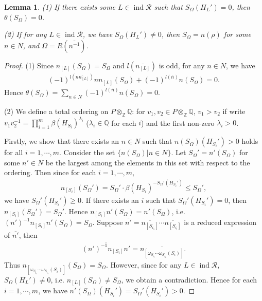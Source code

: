 \documentclass[12pt]{amsart}
\newtheorem{lemma}[theorem]{Lemma}
\begin{document}
\begin{lemma}\label{SOmega}
    (1) If there exists some $L\in \operatorname{ind}\mathcal{R}$ such that $S_{\Omega}(H_L') = 0$, then $\theta(S_{\Omega}) = 0$.

    (2) If for any $L\in \operatorname{ind}\mathcal{R}$, we have $S_{\Omega}(H_{L}')\neq 0$, then $S_{\Omega} = n(\rho)$ for some $n\in N$, and $\Omega = R(\overline{n^{-1}})$.
\end{lemma}

\begin{proof}
    (1) Since $n_{[L]}(S_{\Omega}) = S_{\Omega}$ and $l(\overline{n_{[L]}})$ is odd, for any $n\in N$, we have 
    \begin{align*}
        (-1)^{l(\overline{nn_{[L]}})} nn_{[L]} (S_{\Omega}) + (-1)^{l(\overline{n})} n(S_{\Omega}) = 0.
    \end{align*}
    Hence $\theta(S_{\Omega}) = \sum_{n\in N} (-1)^{l(\overline{n})} n(S_{\Omega}) = 0$.

    (2) We define a total ordering on $P\otimes_{\mathbb{Z}} \mathbb{Q}$: 
    for $v_1,v_2 \in P\otimes_{\mathbb{Z}} \mathbb{Q}$, $v_1>v_2$ if write $v_1v_2^{-1} = \prod_{i=1}^m \beta(H_{S_i})^{\lambda_i}$ ($\lambda_i \in \mathbb{Q}$ for each $i$) and the first non-zero $\lambda_i>0$.
   
    Firstly, we show that there exists an $n\in N$ such that $n(S_{\Omega})(H_{S_i}')>0$ holds for all $i=1,\cdots,m$.
    Consider the set $\{ n(S_{\Omega}) |n\in N  \}$.
    Let $S_{\Omega}' = n'(S_{\Omega})$ for some $n'\in N$ be the largest among the elements in this set with respect to the ordering.
    Then since for each $i=1,\cdots,m$, 
    \begin{align*}
        n_{[S_i]}(S_{\Omega}') = S_{\Omega}' \cdot \beta(H_{S_i})^{-S_{\Omega}'(H_{S_i}')} \leq S_{\Omega}',
    \end{align*}
    we have $S_{\Omega}'(H_{S_i}')\geq 0$.
    If there exists an $i$ such that $S_{\Omega}'(H_{S_i}') = 0$, then $n_{[S_i]}(S_{\Omega}') = S_{\Omega}'$.
    Hence $n_{[S_i]}n'(S_{\Omega}) = n'(S_{\Omega})$, i.e. $(n')^{-1}n_{[S_i]}n'(S_{\Omega})=S_{\Omega}$.
    Suppose $\overline{n'} = \overline{n_{[S_{i_1}]}} \cdots \overline{n_{[S_{i_l}]}}$ is a reduced expression of $\overline{n'}$, 
    then 
    \begin{align*}
        \overline{(n')^{-1}n_{[S_i]}n'} = \overline{n_{[\omega_{S_{i_l}}\cdots \omega_{S_{i_1}} (S_i) ]}}.
    \end{align*}
    Thus $n_{[\omega_{S_{i_l}}\cdots \omega_{S_{i_1}} (S_i)]}(S_{\Omega}) = S_{\Omega}$.
    However, since for any $L\in \operatorname{ind}\mathcal{R}$, $S_{\Omega}(H_{L}')\neq 0$, i.e. $n_{[L]}(S_{\Omega}) \neq S_{\Omega}$, we obtain a contradiction.
    Hence for each $i=1,\cdots,m$, we have $n'(S_{\Omega})(H_{S_i}') =   S_{\Omega}'(H_{S_i}')> 0$.


\end{proof}
\end{document}
